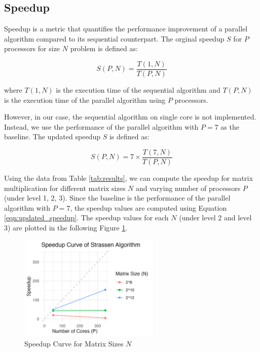 \documentclass[12pt,a4paper]{article}
\begin{document}
\subsection{Speedup}
Speedup is a metric that quantifies the performance improvement of a parallel algorithm compared to its sequential counterpart. 
The orginal speedup \( S \) for \( P \) processors for size $N$ problem is defined as:

\begin{equation*}
    S(P, N) = \frac{T(1,N)}{T(P, N)}
\end{equation*}

where \( T(1,N) \) is the execution time of the sequential algorithm and 
 \( T(P, N) \) is the execution time of the parallel algorithm using \( P \) processors.

However, in our case, the sequential algorithm on single core is not implemented. Instead, 
 we use the performance of the parallel algorithm with \( P = 7 \) as the baseline.
The updated speedup \( S \) is defined as:

\begin{equation}
    \label{eqn:updated_speedup}
    S(P, N) = 7 \times \frac{T(7,N)}{T(P, N)}
\end{equation}


 Using the data from Table \ref{tab:results}, 
  we can compute the speedup for matrix multiplication for different 
  matrix sizes \( N \) and varying number of processors \( P \) (under level 1, 2, 3). 
Since the baseline is the performance of the parallel algorithm with \( P = 7 \), 
 the speedup values are computed using Equation \ref{eqn:updated_speedup}.
The speedup values for each \( N \) (under level 2 and level 3) are plotted in the following Figure \ref{fig:speedup_curve}.

\begin{figure}
    \centering
    \includegraphics[width=0.6\textwidth]{speedup_curve.png}
    \caption{Speedup Curve for Matrix Sizes \( N \)}
    \label{fig:speedup_curve}
\end{figure}
\end{document}
